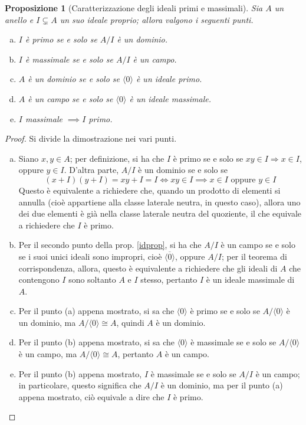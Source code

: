 \documentclass[11pt]{article}
\theoremstyle{style}
\newtheorem{prop}{Proposizione}[section]
\numberwithin{equation}{subsection}
\begin{document}
\begin{prop}
	[Caratterizzazione degli ideali primi e massimali]
\label{idprmaxchar}
	Sia $A$ un anello e $I\subsetneq A$ un suo ideale proprio; allora valgono i seguenti punti.
	\begin{enumerate}[(a).]
		\item $I$ \`e primo se e solo se $A / I$ \`e un dominio.
		\item $I$ \`e massimale se e solo se $A / I$ \`e un campo.
		\item $A$ \`e un dominio se e solo se $\langle 0 \rangle$ \`e un ideale primo.
		\item $A$ \`e un campo se e solo se $\langle 0 \rangle$ \`e un ideale massimale.
		\item $I$ massimale $\implies I$ primo.
	\end{enumerate}
\end{prop}
	\begin{proof}
		Si divide la dimostrazione nei vari punti.
		\begin{enumerate}[(a).]
			\item Siano $x,y \in A$; per definizione, si ha che $I$ \`e primo se e solo se $xy \in I\Rightarrow x \in I$, oppure $y \in I$.
				D'altra parte, $A / I $ \`e un dominio se e solo se 
				\[
					(x+I)(y+I) = xy + I = I \iff xy \in I \implies x \in I \text{ oppure }y\in I
				\] 
				Questo \`e equivalente a richiedere che, quando un prodotto di elementi si annulla (cio\`e appartiene alla classe laterale neutra, in questo caso), allora uno dei due elementi \`e gi\`a nella classe laterale neutra del quoziente, il che equivale a richiedere che $I$ \`e primo.
			\item Per il secondo punto della prop. \ref{idprop}, si ha che $A / I $ \`e un campo se e solo se i suoi unici ideali sono impropri, cio\`e $\overline{\langle 0 \rangle}$, oppure $A / I$; per il teorema di corrispondenza, allora, questo \`e equivalente a richiedere che gli ideali di $A$ che contengono $I$ sono soltanto $A$ e $I$ stesso, pertanto $I$ \`e un ideale massimale di $A$.
			\item Per il punto (a) appena mostrato, si sa che $\langle 0 \rangle$ \`e primo se e solo se $A / \langle 0 \rangle$ \`e un dominio, ma $A / \langle 0 \rangle\cong A$, quindi $A$ \`e un dominio.
			\item Per il punto (b) appena mostrato, si sa che $\langle 0 \rangle$ \`e massimale se e solo se $A / \langle 0 \rangle$ \`e un campo, ma $A / \langle 0 \rangle\cong A$, pertanto $A$ \`e un campo.
			\item Per il punto (b) appena mostrato, $I$ \`e massimale se e solo se $A / I$ \`e un campo; in particolare, questo significa che $A / I$ \`e un dominio, ma per il punto (a) appena mostrato, ci\`o equivale a dire che $I$ \`e primo.
		\end{enumerate}
	\end{proof}
\end{document}
